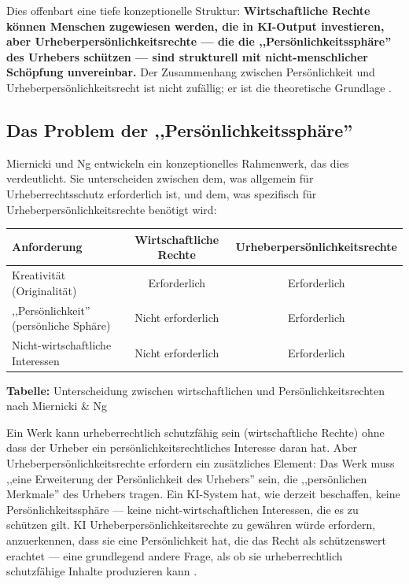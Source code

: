 \documentclass[acmcp, nonacm]{acmart}
\begin{document}
Dies offenbart eine tiefe konzeptionelle Struktur: \textbf{Wirtschaftliche Rechte können Menschen zugewiesen werden, die in KI-Output investieren, aber Urheberpersönlichkeitsrechte --- die die ,,Persönlichkeitssphäre'' des Urhebers schützen --- sind strukturell mit nicht-menschlicher Schöpfung unvereinbar.} Der Zusammenhang zwischen Persönlichkeit und Urheberpersönlichkeitsrecht ist nicht zufällig; er ist die theoretische Grundlage \cite{Miernicki2021}.

\subsection{Das Problem der ,,Persönlichkeitssphäre''}

Miernicki und Ng \cite{Miernicki2021} entwickeln ein konzeptionelles Rahmenwerk, das dies verdeutlicht. Sie unterscheiden zwischen dem, was allgemein für Urheberrechtsschutz erforderlich ist, und dem, was spezifisch für Urheberpersönlichkeitsrechte benötigt wird:

\medskip
\noindent\begin{center}
\begin{tabular}{lcc}
\toprule
\textbf{Anforderung} & \textbf{Wirtschaftliche Rechte} & \textbf{Urheberpersönlichkeitsrechte} \\
\midrule
Kreativität (Originalität) & Erforderlich & Erforderlich \\
,,Persönlichkeit'' (persönliche Sphäre) & Nicht erforderlich & Erforderlich \\
Nicht-wirtschaftliche Interessen & Nicht erforderlich & Erforderlich \\
\bottomrule
\end{tabular}
\par\smallskip
{\small\textbf{Tabelle:} Unterscheidung zwischen wirtschaftlichen und Persönlichkeitsrechten nach Miernicki \& Ng \cite{Miernicki2021}}
\end{center}
\medskip

Ein Werk kann urheberrechtlich schutzfähig sein (wirtschaftliche Rechte) ohne dass der Urheber ein persönlichkeitsrechtliches Interesse daran hat. Aber Urheberpersönlichkeitsrechte erfordern ein zusätzliches Element: Das Werk muss ,,eine Erweiterung der Persönlichkeit des Urhebers'' sein, die ,,persönlichen Merkmale'' des Urhebers tragen. Ein KI-System hat, wie derzeit beschaffen, keine Persönlichkeitssphäre --- keine nicht-wirtschaftlichen Interessen, die es zu schützen gilt. KI Urheberpersönlichkeitsrechte zu gewähren würde erfordern, anzuerkennen, dass sie eine Persönlichkeit hat, die das Recht als schützenswert erachtet --- eine grundlegend andere Frage, als ob sie urheberrechtlich schutzfähige Inhalte produzieren kann \cite{Miernicki2021}.
\end{document}
